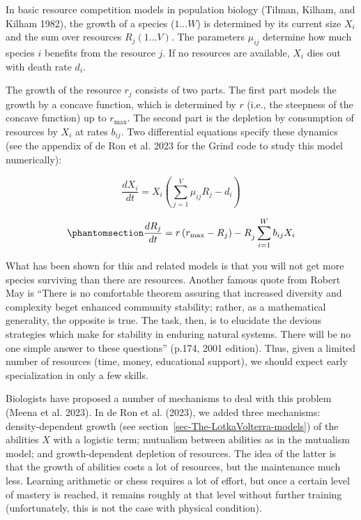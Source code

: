 \documentclass[
  a4paper,
  DIV=11,
  numbers=noendperiod,
  oneside]{scrreprt}
\begin{document}
In basic resource competition models in population biology (Tilman,
Kilham, and Kilham 1982), the growth of a species (\(1...W\)) is
determined by its current size \(X_{i}\) and the sum over resources
\(R_{j} (1...V)\). The parameters \(\mu_{ij}\) determine how much
species \(i\) benefits from the resource \(j\). If no resources are
available, \(X_{i}\) dies out with death rate \(d_{i}\).

The growth of the resource \(r_{j}\) consists of two parts. The first
part models the growth by a concave function, which is determined by
\(r\) (i.e., the steepness of the concave function) up to \(r_{\max}\).
The second part is the depletion by consumption of resources by
\(X_{i}\) at rates \(b_{ij}\). Two differential equations specify these
dynamics (see the appendix of de Ron et al. 2023 for the Grind code to
study this model numerically):

\[\frac{dX_{i}}{dt} = X_{i}(\sum_{j = 1}^{V}{\mu_{ij}R_{j} - d_{i}})\]

\begin{equation}\phantomsection\label{eq-ch6-2-old-43}{
\frac{dR_{j}}{dt} = {r\left( r_{\max} - R_{j} \right) - R}_{j}\sum_{i = 1}^{W}{b_{ij}X_{i}}
}\end{equation}

What has been shown for this and related models is that you will not get
more species surviving than there are resources. Another famous quote
from Robert May is ``There is no comfortable theorem assuring that
increased diversity and complexity beget enhanced community stability;
rather, as a mathematical generality, the opposite is true. The task,
then, is to elucidate the devious strategies which make for stability in
enduring natural systems. There will be no one simple answer to these
questions'' (p.174, 2001 edition). Thus, given a limited number of
resources (time, money, educational support), we should expect early
specialization in only a few skills.

Biologists have proposed a number of mechanisms to deal with this
problem (Meena et al. 2023). In de Ron et al. (2023), we added three
mechanisms: density-dependent growth (see
section~\ref{sec-The-LotkaVolterra-models}) of the abilities \(X\) with
a logistic term; mutualism between abilities as in the mutualism model;
and growth-dependent depletion of resources. The idea of the latter is
that the growth of abilities costs a lot of resources, but the
maintenance much less. Learning arithmetic or chess requires a lot of
effort, but once a certain level of mastery is reached, it remains
roughly at that level without further training (unfortunately, this is
not the case with physical condition).
\end{document}
